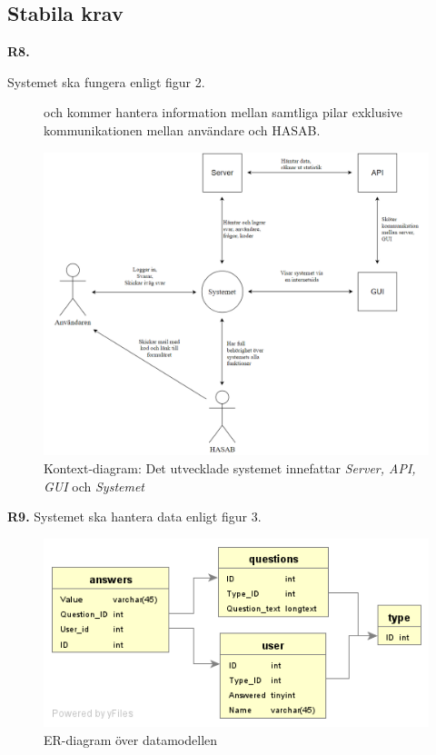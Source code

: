 \documentclass{article}
\begin{document}
    \subsection{Stabila krav}
    \noindent \large{\textbf{R8.}}
    \normalsize{Systemet ska fungera enligt figur 2.
    
    \begin{figure}[h!]
    \caption{Kontext-diagram: Det utvecklade systemet innefattar \textit{Server, API, GUI} och \textit{Systemet}} och kommer hantera information mellan samtliga pilar exklusive kommunikationen mellan användare och HASAB.
    
    \includegraphics[width=150mm]{Kontextdiagram.png}
    
    \end{figure}
}
    \newpage
    \noindent \large{\textbf{R9.}}
    Systemet ska hantera data enligt figur 3.
       \begin{figure}[h!]
    
    \includegraphics[width=150mm]{er.png}
    \caption{ER-diagram över datamodellen}
    \end{figure}
    
\end{document}

